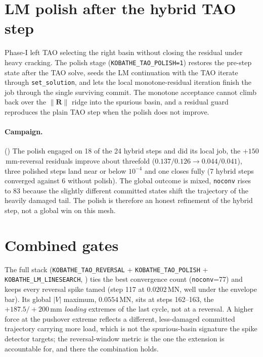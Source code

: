 \section{LM polish after the hybrid TAO step}
\label{sec:tao-polish}

Phase-I left TAO selecting the right basin without closing the
residual under heavy cracking. The polish stage
(\texttt{KOBATHE\_TAO\_POLISH=1}) restores the pre-step state after the
TAO solve, seeds the LM continuation with the TAO iterate through
\texttt{set\_solution}, and lets the local monotone-residual iteration
finish the job through the single surviving commit. The monotone
acceptance cannot climb back over the $\lVert\mathbf R\rVert$ ridge
into the spurious basin, and a residual guard reproduces the plain TAO
step when the polish does not improve.

\paragraph{Campaign.} () The polish
engaged on 18 of the 24 hybrid steps and did its local job, the
$+150$\,mm-reversal residuals improve about threefold
($0.137/0.126 \to 0.044/0.041$), three polished steps land near or
below $10^{-4}$ and one closes fully (7 hybrid steps converged against
6 without polish). The global outcome is mixed, \texttt{noconv} rises
to 83 because the slightly different committed states shift the
trajectory of the heavily damaged tail. The polish is therefore an
honest refinement of the hybrid step, not a global win on this mesh.

\section{Combined gates}
\label{sec:combo}

The full stack (\texttt{KOBATHE\_TAO\_REVERSAL} +
\texttt{KOBATHE\_TAO\_POLISH} + \texttt{KOBATHE\_LM\_LINESEARCH},
) ties the best convergence count
(\texttt{noconv}=77) and keeps every reversal spike tamed (step 117 at
$0.0202$\,MN, well under the envelope bar). Its global $|V|$ maximum,
$0.0554$\,MN, sits at steps 162--163, the $+187.5/+200$\,mm
\emph{loading} extremes of the last cycle, not at a reversal. A
higher force at the pushover extreme reflects a different, less-damaged
committed trajectory carrying more load, which is not the spurious-basin
signature the spike detector targets; the reversal-window metric is the
one the extension is accountable for, and there the combination holds.

